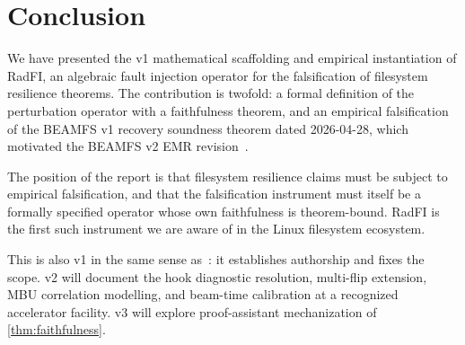 \section{Conclusion}\label{sec:conclusion}

We have presented the v1 mathematical scaffolding and empirical
instantiation of RadFI, an algebraic fault injection operator for
the falsification of filesystem resilience theorems. The
contribution is twofold: a formal definition of the perturbation
operator with a faithfulness theorem, and an empirical falsification
of the BEAMFS v1 recovery soundness theorem dated 2026-04-28, which
motivated the BEAMFS v2 EMR
revision~\cite{desbrieres2026beamfsv2}.

The position of the report is that filesystem resilience claims
must be subject to empirical falsification, and that the
falsification instrument must itself be a formally specified
operator whose own faithfulness is theorem-bound. RadFI is the
first such instrument we are aware of in the Linux filesystem
ecosystem.

This is also v1 in the same sense as~\cite{desbrieres2026beamfsv1}:
it establishes authorship and fixes the scope. v2 will document
the hook diagnostic resolution, multi-flip extension, MBU
correlation modelling, and beam-time calibration at a recognized
accelerator facility. v3 will explore proof-assistant mechanization
of \cref{thm:faithfulness}.
